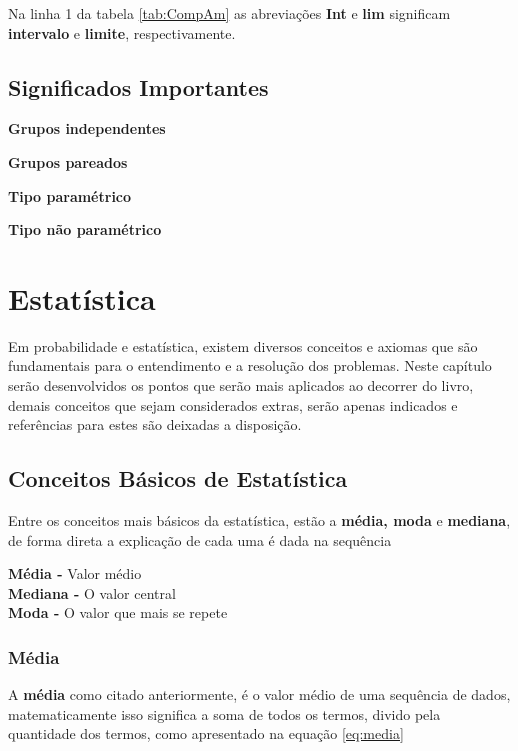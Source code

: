 \documentclass[
]{book}
\begin{document}
Na linha 1 da tabela \ref{tab:CompAm} as abreviações \textbf{Int} e \textbf{lim} significam \textbf{intervalo} e \textbf{limite}, respectivamente.

\hypertarget{significados-importantes}{%
\section{Significados Importantes}\label{significados-importantes}}

\textbf{Grupos independentes}

\textbf{Grupos pareados}

\textbf{Tipo paramétrico}

\textbf{Tipo não paramétrico}

\hypertarget{estatuxedstica}{%
\chapter{Estatística}\label{estatuxedstica}}

Em probabilidade e estatística, existem diversos conceitos e axiomas que são fundamentais para o entendimento e a resolução dos problemas. Neste capítulo serão desenvolvidos os pontos que serão mais aplicados ao decorrer do livro, demais conceitos que sejam considerados extras, serão apenas indicados e referências para estes são deixadas a disposição.

\hypertarget{conceitos-buxe1sicos-de-estatuxedstica}{%
\section{Conceitos Básicos de Estatística}\label{conceitos-buxe1sicos-de-estatuxedstica}}

Entre os conceitos mais básicos da estatística, estão a \textbf{média, moda} e \textbf{mediana}, de forma direta a explicação de cada uma é dada na sequência

\textbf{Média -} Valor médio\\
\textbf{Mediana -} O valor central\\
\textbf{Moda -} O valor que mais se repete

\hypertarget{muxe9dia}{%
\subsection{Média}\label{muxe9dia}}

A \textbf{média} como citado anteriormente, é o valor médio de uma sequência de dados, matematicamente isso significa a soma de todos os termos, divido pela quantidade dos termos, como apresentado na equação \eqref{eq:media}
\end{document}
